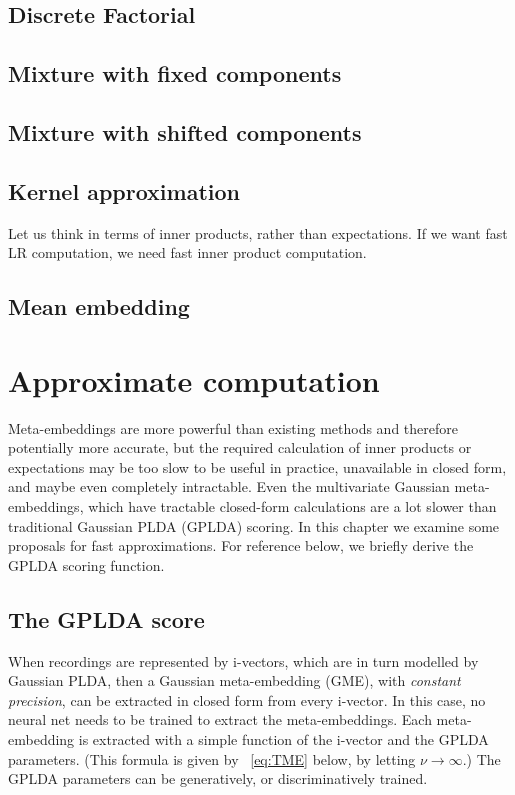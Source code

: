 \documentclass[a4paper,oneside,12pt,english]{report}
\begin{document}
 


\section{Discrete Factorial}

\section{Mixture with fixed components}

\section{Mixture with shifted components}


\section{Kernel approximation}
Let us think in terms of inner products, rather than expectations. If we want fast LR computation, we need fast inner product computation. 



\section{Mean embedding}


\chapter{Approximate computation}
\label{chap:approx}
Meta-embeddings are more powerful than existing methods and therefore potentially more accurate, but the required calculation of inner products or expectations may be too slow to be useful in practice, unavailable in closed form, and maybe even completely intractable. Even the multivariate Gaussian meta-embeddings, which have tractable closed-form calculations are a lot slower than traditional Gaussian PLDA (GPLDA) scoring. In this chapter we examine some proposals for fast approximations. For reference below, we briefly derive the GPLDA scoring function.


\section{The GPLDA score}
When recordings are represented by i-vectors, which are in turn modelled by Gaussian PLDA, then a Gaussian meta-embedding (GME), with \emph{constant precision}, can be extracted in closed form from every i-vector. In this case, no neural net needs to be trained to extract the meta-embeddings. Each meta-embedding is extracted with a simple function of the i-vector and the GPLDA parameters. (This formula is given by ~\eqref{eq:TME} below, by letting $\nu\to\infty$.) The GPLDA parameters can be generatively, or discriminatively trained. 
\end{document}
